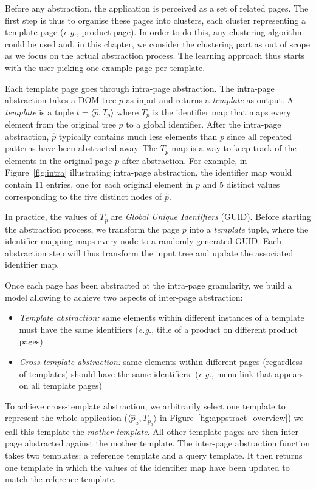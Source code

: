 Before any abstraction, the application is perceived as a set of related pages.
The first step is thus to organise these pages into clusters, each cluster representing a template page (\emph{e.g.}, product page).
In order to do this, any clustering algorithm could be used and, in this chapter, we consider the clustering part as out of scope as we focus on the actual abstraction process.
The learning approach thus starts with the user picking one example page per template.

Each template page goes through intra-page abstraction.
The intra-page abstraction takes a DOM tree $p$ as input and returns a \textit{template} as output.
A \textit{template} is a tuple $t = \langle \hat{p}, T_p \rangle$ where $T_p$ is the identifier map that maps every element from the original tree $p$ to a global identifier. After the intra-page abstraction, $\hat{p}$ typically contains much less elements than $p$ since all repeated patterns have been abstracted away.
The $T_p$ map is a way to keep track of the elements in the original page $p$ after abstraction.
For example, in Figure~\ref{fig:intra} illustrating intra-page abstraction, the identifier map would contain 11 entries, one for each original element in $p$ and 5 distinct values corresponding to the five distinct nodes of $\hat{p}$.

In practice, the values of $T_p$ are \emph{Global Unique Identifiers} (GUID).
Before starting the abstraction process, we transform the page $p$ into a \textit{template} tuple, where the identifier mapping maps every node to a randomly generated GUID.
Each abstraction step will thus transform the input tree and update the associated identifier map.

Once each page has been abstracted at the intra-page granularity, we build a model allowing to achieve two aspects of inter-page abstraction:
\begin{itemize}
    \item \textit{Template abstraction:} same elements within different instances of a template must have the same identifiers (\emph{e.g.}, title of a product on different product pages)
    \item \textit{Cross-template abstraction:} same elements within different pages (regardless of templates) should have the same identifiers. (\emph{e.g.}, menu link that appears on all template pages)
\end{itemize}

To achieve cross-template abstraction, we arbitrarily select one template to represent the whole application ($\langle \hat{p}_a, T_{p_a} \rangle$ in Figure~\ref{fig:appstract_overview}) we call this template the \textit{mother template}.
All other template pages are then inter-page abstracted against the mother template. 
The inter-page abstraction function takes two templates: a reference template and a query template. It then returns one template in which the values of the identifier map have been updated to match the reference template.

